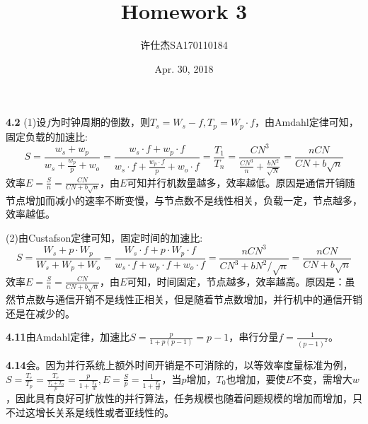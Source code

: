 \documentclass{article}
\title{Homework 3}
\author{许仕杰\qquad SA170110184}
\date{Apr. 30, 2018}
\begin{document}
\maketitle
\noindent
\textbf{4.2}
(1)设$f$为时钟周期的倒数，则$T_s=W_s-f,T_p=W_p\cdot f$，由Amdahl定律可知，固定负载的加速比:
\begin{equation*}
	S=\frac{w_s+w_p}{w_s+\frac{w_p}{p}+w_o}=\frac{w_s\cdot f+w_p\cdot f}{w_s\cdot f+\frac{w_p\cdot f}{p}+w_o\cdot f}=\frac{T_1}{T_n}=\frac{CN^3}{\frac{CN^3}{n}+\frac{bN^2}{\sqrt{N}}}=\frac{nCN}{CN+b\sqrt{n}}
\end{equation*}
效率$E=\frac{S}{n}=\frac{CN}{CN+b\sqrt{n}}$，由$E$可知并行机数量越多，效率越低。原因是通信开销随节点增加而减小的速率不断变慢，与节点数不是线性相关，负载一定，节点越多，效率越低。

(2)由Custafson定律可知，固定时间的加速比:
\begin{equation*}
	S=\frac{W_s+p\cdot W_p}{W_s+W_p+W_o}=\frac{W_s\cdot f+p\cdot W_p\cdot f}{w_s\cdot f+w_p\cdot f+w_o\cdot f}=\frac{nCN^3}{CN^3+bN^2/\sqrt{n}}=\frac{nCN}{CN+b\sqrt{n}}
\end{equation*}
效率$E=\frac{S}{n}=\frac{CN}{CN+b\sqrt{n}}$，由$E$可知，时间固定，节点越多，效率越高。原因是：虽然节点数与通信开销不是线性正相关，但是随着节点数增加，并行机中的通信开销还是在减少的。

\noindent\textbf{4.11}由Amdahl定律，加速比$S=\frac{p}{1+p(p-1)}=p-1$，串行分量$f=\frac{1}{(p-1)^2}$。

\noindent\textbf{4.14}会。因为并行系统上额外时间开销是不可消除的，以等效率度量标准为例，$S=\frac{T_e}{T_p}=\frac{T_e}{\frac{T_e+T_0}{p}}=\frac{p}{1+\frac{T_0}{w}},E=\frac{S}{p}=\frac{1}{1+\frac{T_0}{w}}$，当$p$增加，$T_0$也增加，要使$E$不变，需增大$w$，因此具有良好可扩放性的并行算法，任务规模也随着问题规模的增加而增加，只不过这增长关系是线性或者亚线性的。
\end{document}
